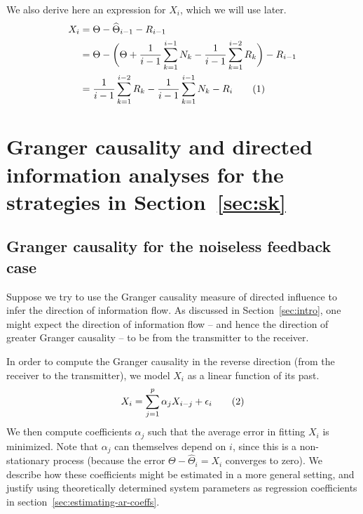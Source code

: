 \documentclass[letterpaper, 10pt, conference]{ieeeconf}
\newcommand\numberthis{\stepcounter{equation}\tag{\theequation}}
\begin{document}
We also derive here an expression for $X_i$, which we will use later.
\begin{align*}
	X_i &= \Theta - \widehat\Theta_{i-1} - R_{i-1} \\
	&= \Theta - \bigg( \Theta + \frac{1}{i-1} \sum_{k=1}^{i-1} N_k - \frac{1}{i-1} \sum_{k=1}^{i-2} R_k \bigg) - R_{i-1} \\
	&= \frac{1}{i-1} \sum_{k=1}^{i-2} R_k - \frac{1}{i-1} \sum_{k=1}^{i-1} N_k - R_{i} \numberthis \label{eq:x_i-noisy}
\end{align*}


\section{Granger causality and directed information analyses for the strategies in Section~\ref{sec:sk}}
\label{sec:analytical-results}


\subsection{Granger causality for the noiseless feedback case}
\label{sec:gc-noiseless}

Suppose we try to use the Granger causality measure of directed influence to infer the direction of information flow. As discussed in Section~\ref{sec:intro}, one might expect the direction of information flow -- and hence the direction of greater Granger causality -- to be from the transmitter to the receiver.

In order to compute the Granger causality in the reverse direction (from the receiver to the transmitter), we model $X_i$ as a linear function of its past.
\begin{equation*}
	X_i = \sum_{j=1}^{p}{\alpha_j X_{i-j}} + \epsilon_i \numberthis \label{eq:ar-model-x-x}
\end{equation*}
We then compute coefficients $\alpha_j$ such that the average error in fitting $X_i$ is minimized. Note that $\alpha_j$ can themselves depend on $i$, since this is a non-stationary process (because the error $\Theta-\widehat{\Theta}_i = X_i$ converges to zero). We describe how these coefficients might be estimated in a more general setting, and justify using theoretically determined system parameters as regression coefficients in section~\ref{sec:estimating-ar-coeffs}.
\end{document}
